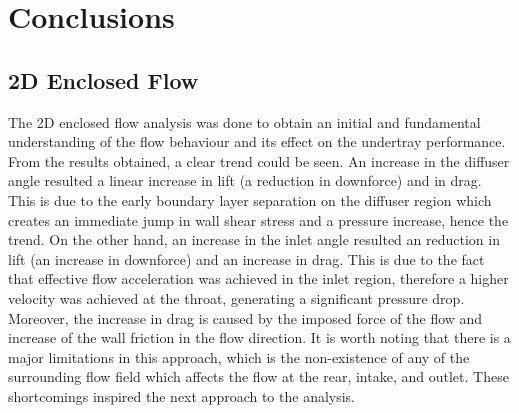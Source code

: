 \section{Conclusions}
\justifying
\subsection{2D Enclosed Flow}
The 2D enclosed flow analysis was done to obtain an initial and fundamental understanding of the flow behaviour and its effect on the undertray performance. From the results obtained, a clear trend could be seen. An increase in the diffuser angle resulted a linear increase in lift (a reduction in downforce) and in drag. This is due to the early boundary layer separation on the diffuser region which creates an immediate jump in wall shear stress and a pressure increase, hence the trend. On the other hand, an increase in the inlet angle resulted an reduction in lift (an increase in downforce) and an increase in drag. This is due to the fact that effective flow acceleration was achieved in the inlet region, therefore a higher velocity was achieved at the throat, generating a significant pressure drop. Moreover, the increase in drag is caused by the imposed force of the flow and increase of the wall friction in the flow direction. It is worth noting that there is a major limitations in this approach, which is the non-existence of any of the surrounding flow field which affects the flow at the rear, intake, and outlet. These shortcomings inspired the next approach to the analysis.


